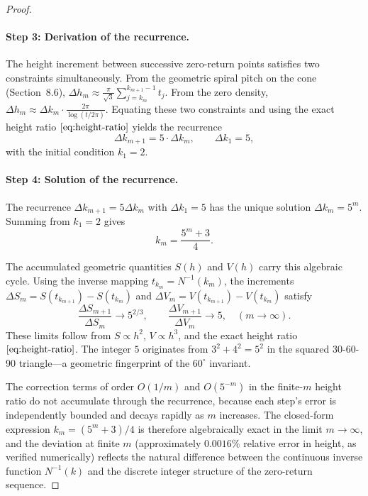\documentclass[12pt,a4paper]{article}
\begin{document}
\begin{proof}
\paragraph{Step 3: Derivation of the recurrence.}
The height increment between successive zero-return points satisfies two constraints simultaneously. From the geometric spiral pitch on the cone (Section~8.6), $\Delta h_m \approx \frac{\pi}{\sqrt{3}} \sum_{j=k_m}^{k_{m+1}-1} t_j$. From the zero density, $\Delta h_m \approx \Delta k_m \cdot \frac{2\pi}{\log(t/2\pi)}$. Equating these two constraints and using the exact height ratio $\eqref{eq:height-ratio}$ yields the recurrence
\begin{equation}
\Delta k_{m+1} = 5 \cdot \Delta k_m, \qquad \Delta k_1 = 5,
\end{equation}
with the initial condition $k_1 = 2$.

\paragraph{Step 4: Solution of the recurrence.}
The recurrence $\Delta k_{m+1} = 5 \Delta k_m$ with $\Delta k_1 = 5$ has the unique solution $\Delta k_m = 5^m$. Summing from $k_1 = 2$ gives
\begin{equation}
\boxed{k_m = \frac{5^m + 3}{4}}.
\end{equation}

The accumulated geometric quantities $S(h)$ and $V(h)$ carry this algebraic cycle. Using the inverse mapping $t_{k_m} = N^{-1}(k_m)$, the increments $\Delta S_m = S(t_{k_{m+1}}) - S(t_{k_m})$ and $\Delta V_m = V(t_{k_{m+1}}) - V(t_{k_m})$ satisfy
\begin{equation}
\frac{\Delta S_{m+1}}{\Delta S_m} \to 5^{2/3}, \qquad \frac{\Delta V_{m+1}}{\Delta V_m} \to 5, \quad (m \to \infty).
\end{equation}
These limits follow from $S \propto h^2$, $V \propto h^3$, and the exact height ratio $\eqref{eq:height-ratio}$. The integer $5$ originates from $3^2+4^2=5^2$ in the squared 30-60-90 triangle---a geometric fingerprint of the $60^\circ$ invariant.

The correction terms of order $O(1/m)$ and $O(5^{-m})$ in the finite-$m$ height ratio do not accumulate through the recurrence, because each step's error is independently bounded and decays rapidly as $m$ increases. The closed-form expression $k_m = (5^m+3)/4$ is therefore algebraically exact in the limit $m \to \infty$, and the deviation at finite $m$ (approximately $0.0016\%$ relative error in height, as verified numerically) reflects the natural difference between the continuous inverse function $N^{-1}(k)$ and the discrete integer structure of the zero-return sequence.
\end{proof}
\end{document}
